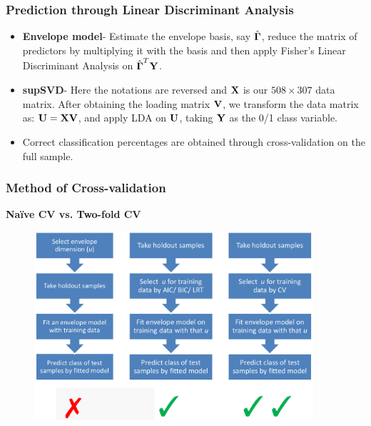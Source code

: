 \documentclass[handout,10pt]{beamer}
\newcommand{\colubf}{\color{UniBlue} \bf}
\begin{document}
\begin{frame}
\frametitle{Prediction through Linear Discriminant Analysis}
\begin{itemize}
\item \textbf{Envelope model}- Estimate the envelope basis, say $\hat{{\boldsymbol{\Gamma}}}$, reduce the matrix of predictors by multiplying it with the basis and then apply Fisher's Linear Discriminant Analysis on $\hat{{\boldsymbol{\Gamma}}}^T{\mathbf{Y}}$.
\vspace{.2cm}
\item \textbf{supSVD}- Here the notations are reversed and ${\mathbf{X}}$ is our $508\times 307$ data matrix. After obtaining the loading matrix ${\mathbf{V}}$, we transform the data matrix as: ${\mathbf{U}} = {\mathbf{X}}{\mathbf{V}}$, and apply LDA on ${\mathbf{U}}$, taking ${\mathbf{Y}}$ as the 0/1 class variable.
\vspace{.2cm}
\item Correct classification percentages are obtained through cross-validation
on the full sample.
\end{itemize}
\end{frame}

\begin{frame}
\frametitle{Method of Cross-validation}
\begin{center}\begin{large}
{\colubf Na\"{i}ve CV vs. Two-fold CV}
\end{large}\end{center}
\begin{figure}\begin{center}
   \includegraphics[height=7cm]{cv.png}
   \label{fig:fig2}
\end{center}\end{figure}
\end{frame}
\end{document}
